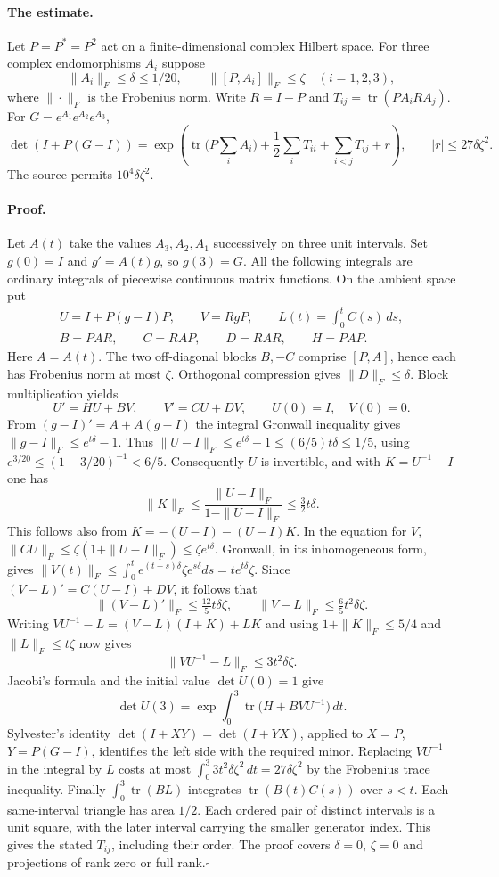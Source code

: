\documentclass[11pt,letterpaper]{article}
\begin{document}
\paragraph{The estimate.}
Let $P=P^*=P^2$ act on a finite-dimensional complex Hilbert space. For three
complex endomorphisms $A_i$ suppose
\[
 \|A_i\|_F\le\delta\le 1/20,\qquad \|[P,A_i]\|_F\le\zeta
 \quad(i=1,2,3),
\]
where $\|\cdot\|_F$ is the Frobenius norm. Write $R=I-P$ and
$T_{ij}=\operatorname{tr}(PA_iRA_j)$. For $G=e^{A_1}e^{A_2}e^{A_3}$,
\[
 \det(I+P(G-I))=
 \exp\!\left(\operatorname{tr}\Big(P\sum_i A_i\Big)
     +\frac12\sum_i T_{ii}+\sum_{i<j}T_{ij}+r\right),
 \qquad |r|\le 27\delta\zeta^2.
\]
The source permits $10^4\delta\zeta^2$.

\paragraph{Proof.}
Let $A(t)$ take the values $A_3,A_2,A_1$ successively on three unit intervals.
Set $g(0)=I$ and $g'=A(t)g$, so $g(3)=G$. All the following integrals are
ordinary integrals of piecewise continuous matrix functions. On the ambient
space put
\[
\begin{gathered}
 U=I+P(g-I)P,\qquad V=RgP,\qquad L(t)=\int_0^t C(s)\,ds,\\
 B=PAR,\qquad C=RAP,\qquad D=RAR,\qquad H=PAP .
\end{gathered}
\]
Here $A=A(t)$. The two off-diagonal blocks $B,-C$ comprise $[P,A]$, hence each has Frobenius
norm at most $\zeta$. Orthogonal compression gives $\|D\|_F\le\delta$.
Block multiplication yields
\[
 U'=HU+BV,\qquad V'=CU+DV,\qquad U(0)=I,\quad V(0)=0.
\]
From $(g-I)'=A+A(g-I)$ the integral Gronwall inequality gives
$\|g-I\|_F\le e^{t\delta}-1$. Thus
$\|U-I\|_F\le e^{t\delta}-1\le (6/5)t\delta\le1/5$,
using $e^{3/20}\le(1-3/20)^{-1}<6/5$.
Consequently $U$ is invertible, and with $K=U^{-1}-I$ one has
\[
 \|K\|_F\le\frac{\|U-I\|_F}{1-\|U-I\|_F}\le\tfrac32 t\delta.
\]
This follows also from $K=-(U-I)-(U-I)K$. In the equation for $V$,
$\|CU\|_F\le\zeta(1+\|U-I\|_F)\le\zeta e^{t\delta}$.
Gronwall, in its inhomogeneous form, gives
$\|V(t)\|_F\le \int_0^t e^{(t-s)\delta}\zeta e^{s\delta}ds
=t e^{t\delta}\zeta$. Since $(V-L)'=C(U-I)+DV$, it follows that
\[
 \|(V-L)'\|_F\le\tfrac{12}{5}t\delta\zeta,\qquad
 \|V-L\|_F\le\tfrac65t^2\delta\zeta.
\]
Writing $VU^{-1}-L=(V-L)(I+K)+LK$ and using
$1+\|K\|_F\le 5/4$ and $\|L\|_F\le t\zeta$ now gives
\[
 \|VU^{-1}-L\|_F\le3t^2\delta\zeta.
\]
Jacobi's formula and the initial value $\det U(0)=1$ give
\[
 \det U(3)=\exp\int_0^3\operatorname{tr}\bigl(H+B VU^{-1}\bigr)\,dt.
\]
Sylvester's identity $\det(I+XY)=\det(I+YX)$, applied to
$X=P$, $Y=P(G-I)$, identifies the left side with the required minor.
Replacing $VU^{-1}$ in the integral by $L$ costs at most
$\int_0^3 3t^2\delta\zeta^2\,dt=27\delta\zeta^2$ by the
Frobenius trace inequality. Finally $\int_0^3\operatorname{tr}(BL)$
integrates $\operatorname{tr}(B(t)C(s))$ over $s<t$. Each same-interval triangle
has area $1/2$. Each ordered pair of distinct intervals is a unit square,
with the later interval carrying the smaller generator index. This gives the
stated $T_{ij}$, including their order. The proof covers $\delta=0$,
$\zeta=0$ and projections of rank zero or full rank.\hfill$\square$
\end{document}
